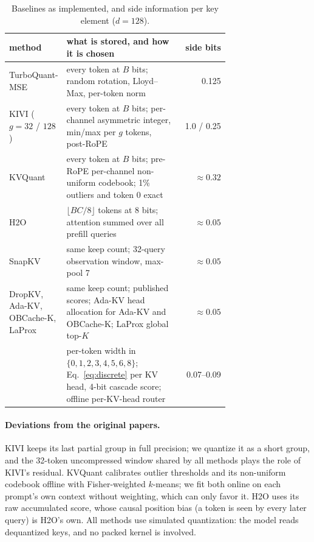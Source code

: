 \begin{table}[h]
\centering
\small
\setlength{\tabcolsep}{4pt}
\caption{Baselines as implemented, and side information per key element ($d=128$).}
\label{tab:app-side}
\begin{tabular}{@{}p{0.2\linewidth}p{0.52\linewidth}r@{}}
\toprule
method & what is stored, and how it is chosen & side bits \\
\midrule
TurboQuant-MSE & every token at $B$ bits; random rotation, Lloyd--Max, per-token norm & 0.125 \\
KIVI ($g=32$ / $128$) & every token at $B$ bits; per-channel asymmetric integer, min/max per $g$ tokens, post-RoPE & 1.0 / 0.25 \\
KVQuant & every token at $B$ bits; pre-RoPE per-channel non-uniform codebook; 1\% outliers and token 0 exact & $\approx0.32$ \\
H2O & $\lfloor BC/8\rfloor$ tokens at 8 bits; attention summed over all prefill queries & $\approx0.05$ \\
SnapKV & same keep count; 32-query observation window, max-pool 7 & $\approx0.05$ \\
DropKV, Ada-KV, OBCache-K, LaProx & same keep count; published scores; Ada-KV head allocation for Ada-KV and OBCache-K; LaProx global top-$K$ & $\approx0.05$ \\
\sieve{} & per-token width in $\{0,1,2,3,4,5,6,8\}$; Eq.~\ref{eq:discrete} per KV head, 4-bit cascade score; offline per-KV-head router & 0.07--0.09 \\
\bottomrule
\end{tabular}
\end{table}

\paragraph{Deviations from the original papers.}
KIVI keeps its last partial group in full precision; we quantize it as a short
group, and the 32-token uncompressed window shared by all methods plays the
role of KIVI's residual.  KVQuant calibrates outlier thresholds and its
non-uniform codebook offline with Fisher-weighted $k$-means; we fit both online
on each prompt's own context without weighting, which can only favor it.  H2O
uses its raw accumulated score, whose causal position bias (a token is seen by
every later query) is H2O's own.  All methods use simulated quantization: the
model reads dequantized keys, and no packed kernel is involved.

\begin{table}[h]
\centering
\small
\caption{\sieve{} (router) against each baseline over the 36 valid cells.  A win or loss is a cell-mean difference above 0.05; the interval resamples prompts within each model and context.}
\label{tab:app-h2h}

\end{table}


